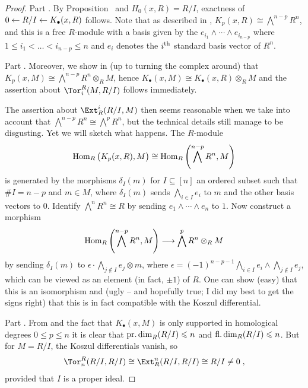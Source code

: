 \documentclass[a4paper,parskip=half,numbers=enddot, DIV=12]{scrreprt}
\renewcommand{\leq}{\leqslant}
\begin{document}
\begin{proof}
	Part . By Proposition~ and $H_0(x,R)=R/I$, exactness of $0\lmorphism R/I\lmorphism K_\bullet(x,R)$ follows. Note that as described in \cite[Remark~2.1.2]{alggeo2}, $K_p(x,R)\cong \bigwedge^{n-p}R^n$, and this is a free $R$-module with a basis given by the $e_{i_1}\wedge \cdots\wedge e_{i_{n-p}}$ where $1\leq i_1<\ldots<i_{n-p}\leq n$ and $e_i$ denotes the $i^{\text{th}}$ standard basis vector of $R^n$.
	
	Part . Moreover, we show in \cite[Remark~2.1.2]{alggeo2} (up to turning the complex around) that $K_p(x,M)\cong \bigwedge^{n-p}R^n\otimes_RM$, hence $K_\bullet(x,M)\cong K_\bullet(x,R)\otimes_RM$ and the assertion about $\Tor_i^R(M,R/I)$ follows immediately. 
	
	The assertion about $\Ext_R^i(R/I,M)$ then seems reasonable when we take into account that $\bigwedge^{n-p}R^n\cong \bigwedge^pR^n$, but the technical details still manage to be disgusting. Yet we will sketch what happens. The $R$-module 
	\begin{align*}
		\operatorname{Hom}_R\big(K_p(x,R),M\big)\cong \operatorname{Hom}_R\left(\bigwedge^{n-p}R^n,M\right)
	\end{align*}
	is generated by the morphisms $\delta_I(m)$ for $I\subseteq [n]$ an ordered subset such that $\#I=n-p$ and $m\in M$, where $\delta_I(m)$ sends $\bigwedge_{i\in I}e_i$ to $m$ and the other basis vectors to $0$. Identify $\bigwedge^n R^n\cong R$ by sending $e_1\wedge\cdots\wedge e_n$ to $1$. Now construct a morphism 
	\begin{align*}
		\Hom_R\left(\bigwedge^{n-p}R^n,M\right)\morphism \bigwedge^pR^n\otimes_R M
	\end{align*}
	by sending $\delta_I(m)$ to $\epsilon\cdot \bigwedge_{j\notin I}e_j\otimes m$, where $\epsilon=(-1)^{n-p-1}\bigwedge_{i\in I}e_i\wedge\bigwedge_{j\notin I}e_j$, which can be viewed as an element (in fact, $\pm 1$) of $R$. One can show (easy) that this is an isomorphism and (ugly -- and hopefully true; I did my best to get the signs right) that this is in fact compatible with the Koszul differential.
	
	Part . From  and the fact that $K_\bullet(x,M)$ is only supported in homological degrees $0\leq p\leq n$ it is clear that $\pdim_R(R/I)\leq n$ and $\fdim_R(R/I)\leq n$. But for $M=R/I$, the Koszul differentials vanish, so
	\begin{align*}
		\Tor_n^R(R/I,R/I)\cong\Ext_R^n(R/I,R/I)\cong R/I\neq 0\;, 
	\end{align*}
	provided that $I$ is a proper ideal.
\end{proof}
\end{document}

